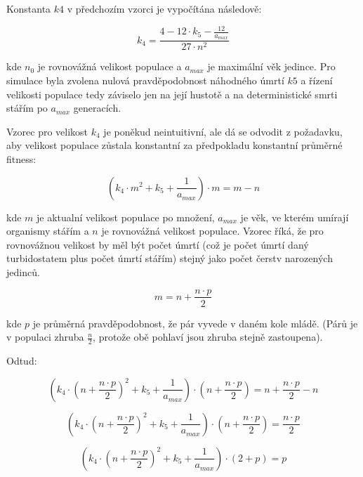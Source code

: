 Konstanta $k4$ v předchozím vzorci je vypočítána následově:

\begin{equation}
k_4 = \frac{4 - 12\cdot{}{k_5} - \frac{12}{a_{max}}}
           {27\cdot{}n^2}
\end{equation}


kde $n_0$ je rovnovážná velikost populace a $a_{max}$ je maximální věk jedince.
Pro simulace byla zvolena nulová pravděpodobnost náhodného úmrtí $k5$ a řízení velikosti populace tedy záviselo jen na
její hustotě a na deterministické smrti stářím po $a_{max}$ generacích.

Vzorec pro velikost $k_4$ je poněkud neintuitivní, ale dá se odvodit z požadavku, aby velikost populace zůstala
konstantní za předpokladu konstantní průměrné fitness:

\begin{equation}
(k_4\cdot{m^2} + {k_5} + \frac{1}{a_{max}})\cdot{m} = m - n
\end{equation}

kde $m$ je aktualní velikost populace po množení, $a_{max}$ je věk, ve kterém umírají organismy stářím a $n$ je rovnovážná
velikost populace. Vzorec říká, že pro rovnovážnou velikost by měl být počet úmrtí (což je počet úmrtí daný
turbidostatem plus počet úmrtí stářím) stejný jako počet čerstv narozených jedinců.

\begin{equation}
m = n + \frac{n\cdot{}p}{2}
\end{equation}

kde $p$ je průměrná pravděpodobnost, že pár vyvede v daném kole mládě. (Párů je v populaci zhruba $\frac{n}{2}$, protože
obě pohlaví jsou zhruba stejně zastoupena).


Odtud:

\begin{equation}
(k_4\cdot{(n + \frac{n\cdot{}p}{2})^2} + {k_5} + \frac{1}{a_{max}})\cdot{(n + \frac{n\cdot{}p}{2})}
        = n + \frac{n\cdot{}p}{2}  - n
\end{equation}

\begin{equation}
(k_4\cdot{(n + \frac{n\cdot{}p}{2})^2} + {k_5} + \frac{1}{a_{max}})\cdot{(n + \frac{n\cdot{}p}{2})} = \frac{n\cdot{}p}{2}
\end{equation}

\begin{equation}
(k_4\cdot{(n + \frac{n\cdot{}p}{2})^2} + {k_5} + \frac{1}{a_{max}})\cdot{(2 + p)} = p
\end{equation}


